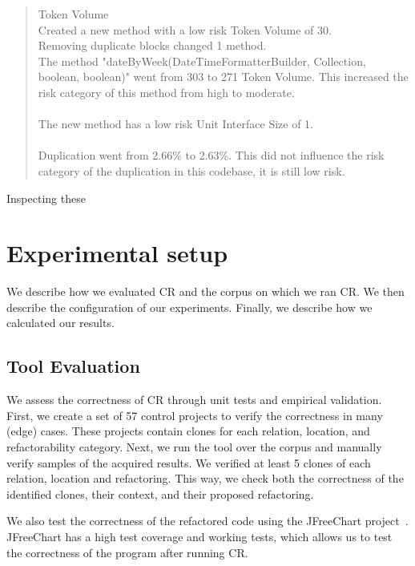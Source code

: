 \documentclass[sigconf,review,anonymous]{acmart}
\begin{document}
\begin{quote}
Token Volume\\
Created a new method with a low risk Token Volume of 30.\\
Removing duplicate blocks changed 1 method.\\
The method "dateByWeek(DateTimeFormatterBuilder, Collection, boolean, boolean)" went from 303 to 271 Token Volume. This increased the risk category of this method from high to moderate.\\
\\
The new method has a low risk Unit Interface Size of 1.\\
\\
Duplication went from 2.66\% to 2.63\%. This did not influence the risk category of the duplication in this codebase, it is still low risk.
\end{quote}
Inspecting these 

\section{Experimental setup} \label{sec:experimentalsetup}
We describe how we evaluated CR and the corpus on which we ran CR. We then describe the configuration of our experiments. Finally, we describe how we calculated our results.

\subsection{Tool Evaluation}
We assess the correctness of CR through unit tests and empirical validation. First, we create a set of 57 control projects to verify the correctness in many (edge) cases. These projects contain clones for each relation, location, and refactorability category. 
Next, we run the tool over the corpus and manually verify samples of the acquired results. We verified at least 5 clones of each relation, location and refactoring. This way, we check both the correctness of the identified clones, their context, and their proposed refactoring.

We also test the correctness of the refactored code using the JFreeChart project~\cite{gilbert2002jfreechart}. JFreeChart has a high test coverage and working tests, which allows us to test the correctness of the program after running CR.
\end{document}
